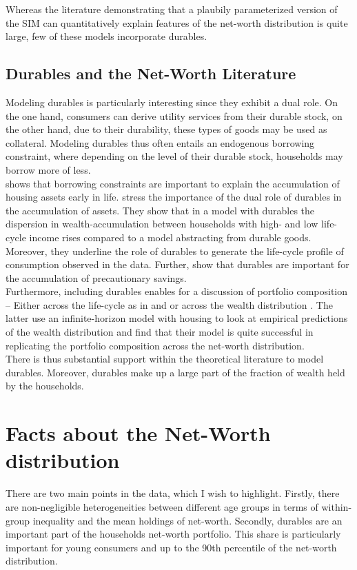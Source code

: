 \documentclass[a4paper,12pt,legno]{article}
\begin{document}
Whereas the literature demonstrating that a plaubily parameterized version of the SIM can quantitatively explain features of the net-worth distribution is quite large, few of these models incorporate durables.

\subsection{Durables and the Net-Worth Literature}

Modeling durables is particularly interesting since they exhibit a dual role. On the one hand, consumers can derive utility services from their durable stock, on the other hand, due to their durability, these types of goods may be used as collateral. Modeling durables thus often entails an endogenous borrowing constraint, where depending on the level of their durable stock, households may borrow more of less. \\
\cite{yang2009} shows that borrowing constraints are important to explain the accumulation of housing assets early in life. \cite{FV&K2011} stress the importance of the dual role of durables in the accumulation of assets. They show that in a model with durables the dispersion in wealth-accumulation between households with high- and low life-cycle income rises compared to a model abstracting from durable goods. Moreover, they underline the role of durables to generate the life-cycle profile of consumption observed in the data. Further, \cite{gruber2003precautionary} show that durables are important for the accumulation of precautionary savings.    
\\
Furthermore, including durables enables for a discussion of portfolio composition \--- Either across the life-cycle as in \cite{yang2009} and \cite{FV&K2011} or across the wealth distribution \citep{diaz2010}. The latter use an infinite-horizon model with housing to look at empirical predictions of the wealth distribution and find that their model is quite successful in replicating the portfolio composition across the net-worth distribution.
\\
There is thus substantial support within the theoretical literature to model durables. Moreover, durables make up a large part of the fraction of wealth held by the households. 

\section{Facts about the Net-Worth distribution } \label{facts} There are two main points in the data, which I wish to highlight. Firstly, there are non-negligible heterogeneities between different age groups in terms of within-group inequality and the mean holdings of net-worth. Secondly, durables are an important part of the households net-worth portfolio. This share is particularly important for young consumers and up to the 90th percentile of the net-worth distribution. 
\end{document}
